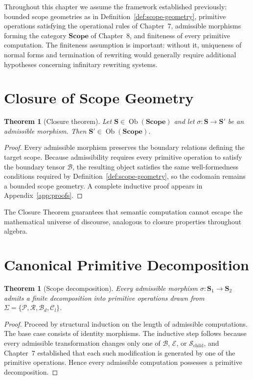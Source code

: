 \documentclass[11pt,twoside,openright]{book}
\numberwithin{equation}{chapter}
\theoremstyle{definition}
\theoremstyle{plain}
\newtheorem{theorem}[definition]{Theorem}
\theoremstyle{remark}
\theoremstyle{definition}
\newcommand{\CatScope}{\mathbf{Scope}}
\newcommand{\Scope}{\mathbf{S}}
\newcommand{\ScopeMorph}{\sigma}
\newcommand{\Alphabet}{\Sigma}
\newcommand{\Pop}{\mathcal{P}}
\newcommand{\Refuse}{\mathcal{R}}
\newcommand{\Bind}{\mathcal{B}_d}
\newcommand{\Collapse}{\mathcal{C}_l}
\newcommand{\ScopeAlphabet}{\Alphabet=\{\Pop,\Refuse,\Bind,\Collapse\}}
\newcommand{\Boundary}{\mathcal{B}}
\newcommand{\Interior}{\mathcal{E}}
\newcommand{\Children}{\mathcal{S}_{\mathrm{child}}}
\DeclareMathOperator{\Obj}{Ob}
\begin{document}
Throughout this chapter we assume the framework established previously:
bounded scope geometries as in Definition~\ref{def:scope-geometry},
primitive operations satisfying the operational rules of Chapter~7,
admissible morphisms forming the category $\CatScope$ of Chapter~8, and
finiteness of every primitive computation. The finiteness assumption is
important: without it, uniqueness of normal forms and termination of
rewriting would generally require additional hypotheses concerning
infinitary rewriting systems.

\section{Closure of Scope Geometry}

\begin{theorem}[Closure theorem]
\label{thm:closure}
Let $\Scope\in\Obj(\CatScope)$ and let $\ScopeMorph:\Scope\to\Scope'$ be an
admissible morphism. Then $\Scope'\in\Obj(\CatScope)$.
\end{theorem}

\begin{proof}
Every admissible morphism preserves the boundary relations defining the
target scope. Because admissibility requires every primitive operation to
satisfy the boundary tensor $\Boundary$, the resulting object satisfies the
same well-formedness conditions required by
Definition~\ref{def:scope-geometry}, so the codomain remains a bounded
scope geometry. A complete inductive proof appears in Appendix~\ref{app:proofs}.
\end{proof}

The Closure Theorem guarantees that semantic computation cannot escape
the mathematical universe of discourse, analogous to closure properties
throughout algebra.

\section{Canonical Primitive Decomposition}

\begin{theorem}[Scope decomposition]
\label{thm:decomposition}
Every admissible morphism $\ScopeMorph:\Scope_1\to\Scope_2$ admits a finite
decomposition into primitive operations drawn from $\ScopeAlphabet$.
\end{theorem}

\begin{proof}
Proceed by structural induction on the length of admissible computations.
The base case consists of identity morphisms. The inductive step follows
because every admissible transformation changes only one of $\Boundary$,
$\Interior$, or $\Children$, and Chapter~7 established that each such
modification is generated by one of the primitive operations. Hence every
admissible computation possesses a primitive decomposition.
\end{proof}
\end{document}
